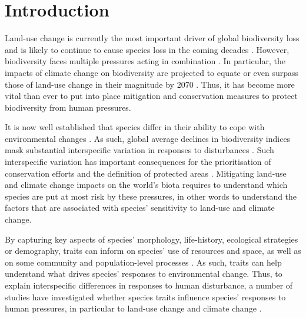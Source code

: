 \section{Introduction}
Land-use change is currently the most important driver of global biodiversity loss \citep{Newbold2015} and is likely to continue to cause species loss in the coming decades  \citep{Powers2019, Stehfest2019, Li2022}. However, biodiversity faces multiple pressures acting in combination \citep{Maxwell2016}. In particular, the impacts of climate change on biodiversity are projected to equate or  even surpass those of land-use change in their magnitude by 2070 \citep{Newbold2018}. Thus, it has become more vital than ever to put into place mitigation and conservation measures to protect biodiversity from human pressures.  

It is now well established that species differ in their ability  to cope with environmental changes \citep{Newbold2013, Matich2019, Ferreira2022}. As such, global average declines in biodiversity indices mask substantial interspecific variation in responses to disturbances \citep{Leung2020}. Such interspecific variation has important consequences for the prioritisation of conservation efforts and the definition of protected areas \citep{Morelli2021}. Mitigating land-use and climate change impacts on the world's biota requires to understand which species are put at most risk by these pressures, in other words to understand the factors that are associated with species' sensitivity to land-use and climate change. 

By capturing key aspects of species' morphology, life-history, ecological strategies or demography, traits can inform on species' use of resources and space, as well as on some community and population-level processes \citep{Capdevila2022a}. As such, traits can help understand what drives species' responses to environmental change. Thus, to explain interspecific differences in responses to human disturbance, a number of studies have investigated whether species traits influence species' responses to human pressures, in particular to land-use change \citep{Newbold2013, Quesnelle2014, Nowakowski2017, Tinoco2018} and climate change \citep{Angert2011, Schloss2012, Mccain2014, Pearson2014, Pacifici2017, Estrada2018, DiMarco2021}. 

